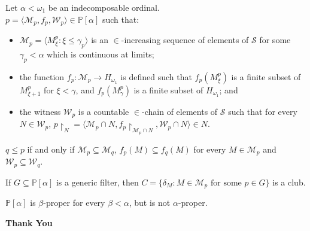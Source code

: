 \documentclass{beamer}
\begin{document}
\begin{frame}
\begin{definition}
Let $\alpha < \omega_1$ be an indecomposable ordinal.\\
$p=\langle \mathcal{M}_p, f_p, \mathcal{W}_p \rangle \in \mathbb{P}[\alpha]$ such that:
\begin{itemize}
\item
$\mathcal{M}_p=\langle M^p_{\xi} \colon \xi \leq \gamma_p \rangle$ is an $\in$-increasing sequence of elements of $\mathcal{S}$ for some $\gamma_p < \alpha$ which is continuous at limits;
\item
the function $f_p: \mathcal{M}_p \longrightarrow H_{\omega_1}$ is defined such that $f_p(M^p_{\xi})$ is a finite subset of $M^p_{\xi+1}$ for $\xi < \gamma$, and $f_p(M^p_{\gamma})$ is a finite subset of $H_{\omega_1}$; and
\item
the witness $\mathcal{W}_p$ is a countable $\in$-chain of elements of $\mathcal{S}$ such that for every $N \in \mathcal{W}_p$, $p{\restriction}_N= \langle \mathcal{M}_p \cap N, f_p{\restriction}_{\mathcal{M}_p \cap N}, \mathcal{W}_p \cap N \rangle \in N$.
\end{itemize}
$q \leq p$ if and only if $\mathcal{M}_p \subseteq \mathcal{M}_q$, $f_p(M) \subseteq f_q(M)$ for every $M \in \mathcal{M}_p$ and $\mathcal{W}_p \subseteq \mathcal{W}_q$.
\end{definition}
\end{frame}
\begin{frame}
\begin{lemma}
If $G \subseteq \mathbb{P}[\alpha]$ is a generic filter, then $C=\{\delta_M \colon M \in \mathcal{M}_p \text{ for some } p \in G\}$ is a club.
\end{lemma}
\begin{theorem}\label{main}
$\mathbb{P}[\alpha]$ is $\beta$-proper for every $\beta < \alpha$, but is not $\alpha$-proper.
\end{theorem}
\end{frame}
\begin{frame}
\begin{center}
\textbf{{\Huge Thank You}}
\end{center}
\end{frame}
\end{document}
